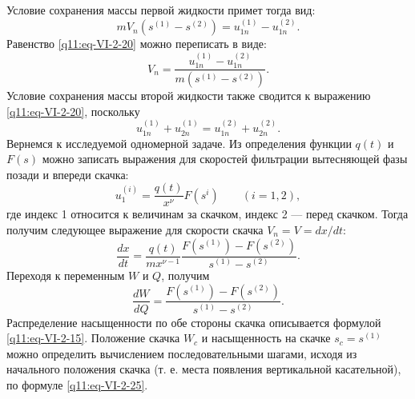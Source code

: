 Условие сохранения массы первой жидкости примет тогда вид:
\begin{equation}mV_n(s^{(1)}-s^{(2)})=u_{1n}^{(1)}-u_{1n}^{(2)}.\tag{VI.2.20}\label{q11:eq-VI-2-20}\end{equation}
Равенство \eqref{q11:eq-VI-2-20} можно переписать в виде:
\begin{equation}V_n=\frac{u_{1n}^{(1)}-u_{1n}^{(2)}}{m(s^{(1)}-s^{(2)})}.\tag{VI.2.21}\label{q11:eq-VI-2-21}\end{equation}
Условие сохранения массы второй жидкости также сводится к выражению \eqref{q11:eq-VI-2-20}, поскольку
\begin{equation}u_{1n}^{(1)}+u_{2n}^{(1)}=u_{1n}^{(2)}+u_{2n}^{(2)}.\tag{VI.2.22}\label{q11:eq-VI-2-22}\end{equation}
Вернемся к исследуемой одномерной задаче. Из определения функции $q(t)$ и $F(s)$ можно записать выражения для скоростей фильтрации вытесняющей фазы позади и впереди скачка:
\begin{equation}u_1^{(i)}=\frac{q(t)}{x^\nu}F(s^i)\qquad(i=1,2),\tag{VI.2.23}\label{q11:eq-VI-2-23}\end{equation}
где индекс 1 относится к величинам за скачком, индекс 2 --- перед скачком. Тогда получим следующее выражение для скорости скачка $V_n=V=dx/dt$:
\begin{equation}\frac{dx}{dt}=\frac{q(t)}{mx^{\nu-1}}\frac{F(s^{(1)})-F(s^{(2)})}{s^{(1)}-s^{(2)}}.\tag{VI.2.24}\label{q11:eq-VI-2-24}\end{equation}
Переходя к переменным $W$ и $Q$, получим
\begin{equation}\frac{dW}{dQ}=\frac{F(s^{(1)})-F(s^{(2)})}{s^{(1)}-s^{(2)}}.\tag{VI.2.25}\label{q11:eq-VI-2-25}\end{equation}
Распределение насыщенности по обе стороны скачка описывается формулой \eqref{q11:eq-VI-2-15}. Положение скачка $W_c$ и насыщенность на скачке $s_c=s^{(1)}$ можно определить вычислением последовательными шагами, исходя из начального положения скачка (т. е. места появления вертикальной касательной), по формуле \eqref{q11:eq-VI-2-25}.

